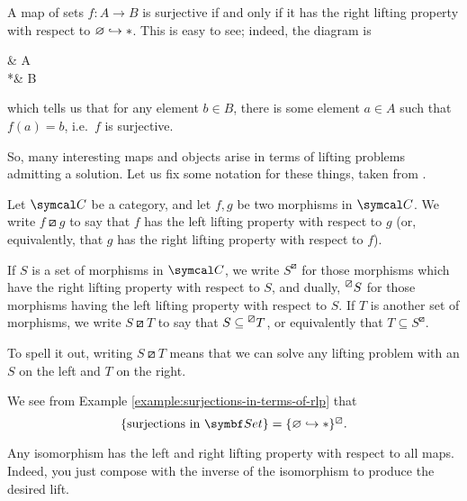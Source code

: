 \begin{example}\label{example:surjections-in-terms-of-rlp}
	A map of sets \(f\!:A\to B\) is surjective if and only if it has the right lifting property with respect to \(\varnothing \hookrightarrow *\). This is easy to see; indeed, the diagram is
	\begin{diagram*}
		\varnothing\ar[d]\ar[r] & A\ar[d,"f"] \\
		*\ar[r]\ar[ur,dashed] & B
	\end{diagram*}
	which tells us that for any element \(b\in B\), there is some element \(a\in A\) such that \(f(a)=b\), i.e.\ \(f\) is surjective.
\end{example}

So, many interesting maps and objects arise in terms of lifting problems admitting a solution. Let us fix some notation for these things, taken from \cite{riehl-categorical-homotopy-theory}.
\begin{notation}
	Let \(\calC\) be a category, and let \(f,g\) be two morphisms in \(\calC\). We write \(f\boxslash g\) to say that \(f\) has the left lifting property with respect to \(g\) (or, equivalently, that \(g\) has the
	right lifting property with respect to \(f\)).

	If \(S\) is a set of morphisms in \(\calC\), we write \(S^\boxslash\) for those morphisms which have the right lifting property with respect to \(S\), and dually, \(\prescript{\boxslash}{}{S}\)
	for those morphisms having the left lifting property with respect to \(S\). If \(T\) is another set of morphisms, we write \(S\boxslash T\) to say that \(S\subseteq \prescript{\boxslash}{}{T}\),
	or equivalently that \(T\subseteq S^\boxslash\).
\end{notation}
\begin{remark}
	To spell it out, writing \(S\boxslash T\) means that we can solve any lifting problem with an \(S\) on the left and \(T\) on the right.
\end{remark}
\begin{example}
	We see from Example \ref{example:surjections-in-terms-of-rlp} that
	\[ \{ \text{surjections in }\Set \} = \{\varnothing\inj *\}^\boxslash. \]
\end{example}

\begin{example}
	Any isomorphism has the left and right lifting property with respect to all maps. Indeed, you just compose with the inverse of the isomorphism to produce the desired lift.
\end{example}

